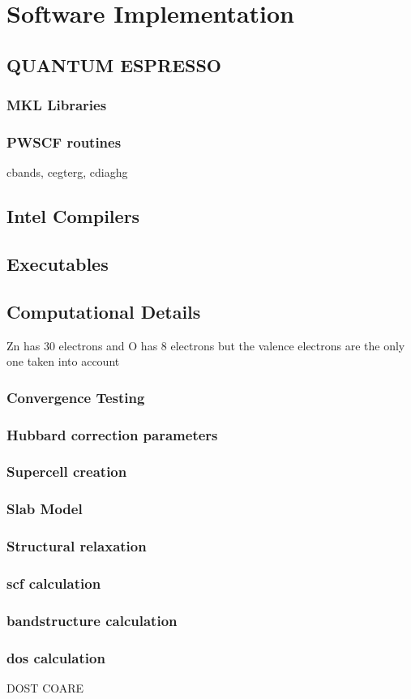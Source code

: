 \chapter{Software Implementation}
    \section{QUANTUM ESPRESSO}
        \subsection{MKL Libraries}
        \subsection{PWSCF routines}
            cbands, cegterg, cdiaghg 
    \section{Intel Compilers}
    \section{Executables}
    \section{Computational Details}
    Zn has 30 electrons and O has 8 electrons but the valence electrons are the only one taken into account
        \subsection{Convergence Testing}
        \subsection{Hubbard correction parameters}
        \subsection{Supercell creation}
        \subsection{Slab Model}
        \subsection{Structural relaxation}
        \subsection{scf calculation}
        \subsection{bandstructure calculation}
        \subsection{dos calculation}

DOST COARE
